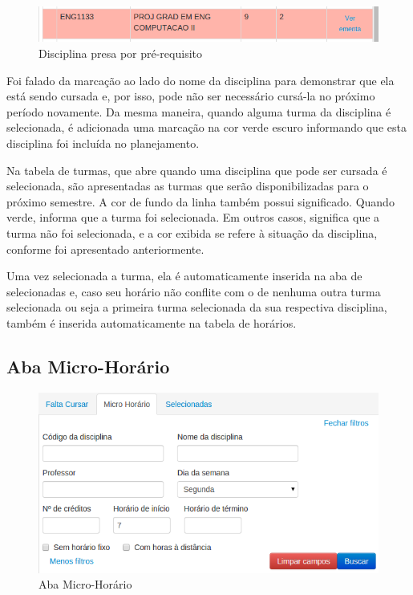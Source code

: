 \documentclass[graduacao,brazil]{ThesisPUC}
\begin{document}
\begin{figure}[H]
    \centering
    \includegraphics[width=0.7\linewidth]{img/v3_disciplina_presa.png}
    \caption{Disciplina presa por pré-requisito}
\end{figure}

Foi falado da marcação ao lado do nome da disciplina para demonstrar que ela está sendo cursada e, por isso, pode não ser necessário cursá-la no próximo período novamente. Da mesma maneira, quando alguma turma da disciplina é selecionada, é adicionada uma marcação na cor verde escuro informando que esta disciplina foi incluída no planejamento. 

Na tabela de turmas, que abre quando uma disciplina que pode ser cursada é selecionada, são apresentadas as turmas que serão disponibilizadas para o próximo semestre. A cor de fundo da linha também possui significado. Quando verde, informa que a turma foi selecionada. Em outros casos, significa que a turma não foi selecionada, e a cor exibida se refere à situação da disciplina, conforme foi apresentado anteriormente.  

Uma vez selecionada a turma, ela é automaticamente inserida na aba de selecionadas e, caso seu horário não conflite com o de nenhuma outra turma selecionada ou seja a primeira turma selecionada da sua respectiva disciplina, também é inserida automaticamente na tabela de horários.

\subsection{Aba Micro-Horário}

\begin{figure}[H]
    \centering
    \includegraphics[width=0.8\linewidth]{img/v3_aba_microhorario.png}
    \caption{Aba Micro-Horário}
\end{figure}
\end{document}
